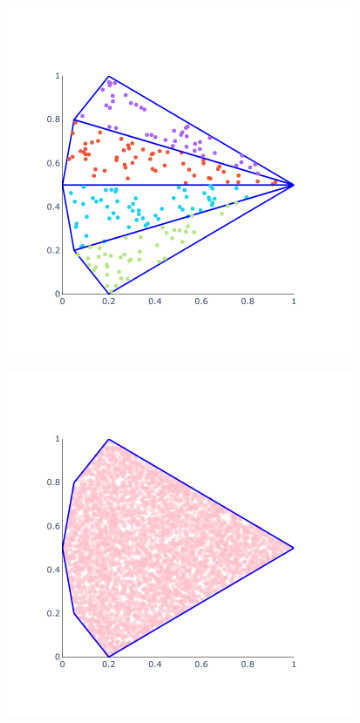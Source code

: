 \begin{figure}[h]
\begin{subfigure}{.45\textwidth}
		\caption{}
		\label{fig:sampling_2}
	\end{subfigure}
	\vspace{-10pt}
	\begin{subfigure}{.45\textwidth}
		\centering
		\includegraphics[width=1.\textwidth]{./Images/sampling_3}
		\caption{}
		\label{fig:sampling_3}
	\end{subfigure}%
	\begin{subfigure}{.45\textwidth}
		\centering
		\includegraphics[width=1.\textwidth]{./Images/sampling_4}

\end{subfigure}
\end{figure}
